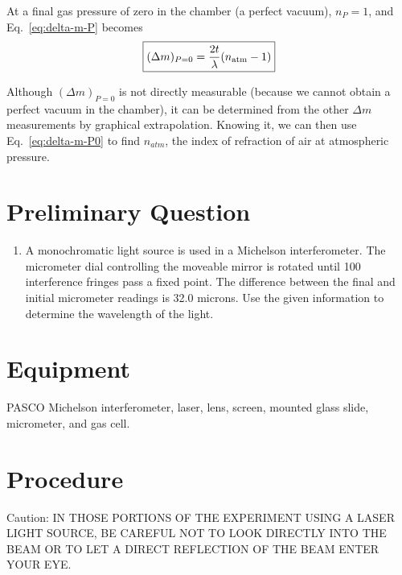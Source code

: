 At a final gas pressure of zero in the chamber (a perfect vacuum), 
$n_P = 1$, and Eq.~\ref{eq:delta-m-P} becomes
\begin{equation}
\boxed{ (\Delta m)_{P=0} = \frac{2t}{\lambda}(n_{\rm atm} - 1)}
\label{eq:delta-m-P0}
\end{equation}

Although $(\Delta m)_{P=0}$ is not directly measurable (because we cannot obtain
a perfect vacuum in the chamber), it can be determined from the other $\Delta m$
measurements by graphical extrapolation. Knowing it, we can then use
Eq.~\ref{eq:delta-m-P0} to find $n_{atm}$, the index of refraction of air at
atmospheric pressure.

\section{Preliminary Question}

\begin{enumerate}
\item A monochromatic light source is used in a Michelson interferometer.  The
  micrometer dial controlling the moveable mirror is rotated until 100
  interference fringes pass a fixed point. The difference between the final and
  initial micrometer readings is 32.0 microns. Use the given information to determine
  the wavelength of the light.
\end{enumerate}

\section{Equipment}
PASCO Michelson interferometer, laser, lens, screen, 
mounted glass slide, micrometer, and gas cell.

\section{Procedure}

Caution: IN THOSE PORTIONS OF THE EXPERIMENT USING A LASER LIGHT 
SOURCE, BE CAREFUL NOT TO LOOK DIRECTLY INTO THE BEAM OR TO LET 
A DIRECT REFLECTION OF THE BEAM ENTER YOUR EYE.

